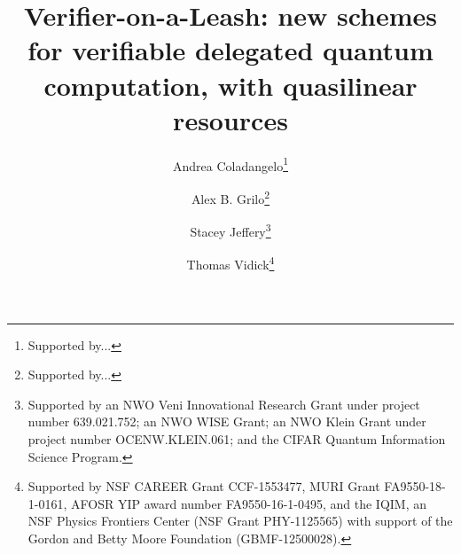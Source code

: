 \begin{frontmatter}%


\title{Verifier-on-a-Leash: new schemes for verifiable delegated quantum computation, with quasilinear resources}




\author[coladangelo]{Andrea Coladangelo\thanks{Supported by...}}
\author[grilo]{Alex B. Grilo\thanks{Supported by...}}
\author[jeffery]{Stacey Jeffery\thanks{Supported by an NWO Veni Innovational Research Grant under project number 639.021.752; an NWO WISE Grant; an NWO Klein Grant under project number OCENW.KLEIN.061;
and the CIFAR Quantum Information Science Program.
}}
\author[vidick]{Thomas Vidick\thanks{Supported by NSF CAREER Grant CCF-1553477, MURI Grant FA9550-18-1-0161, AFOSR YIP award number FA9550-16-1-0495, and the IQIM, an NSF Physics Frontiers Center (NSF Grant PHY-1125565) with support of the Gordon and Betty Moore Foundation (GBMF-12500028).}}

\begin{abstract}

\end{abstract}

\iffalse %


\end{frontmatter}
